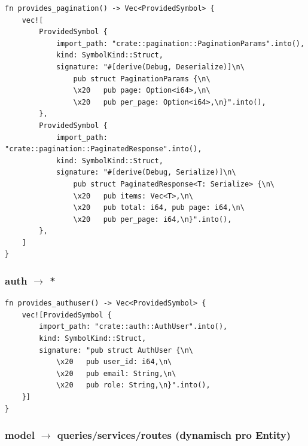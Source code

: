 \documentclass[11pt,a4paper]{article}
\begin{document}
\begin{lstlisting}
fn provides_pagination() -> Vec<ProvidedSymbol> {
    vec![
        ProvidedSymbol {
            import_path: "crate::pagination::PaginationParams".into(),
            kind: SymbolKind::Struct,
            signature: "#[derive(Debug, Deserialize)]\n\
                pub struct PaginationParams {\n\
                \x20   pub page: Option<i64>,\n\
                \x20   pub per_page: Option<i64>,\n}".into(),
        },
        ProvidedSymbol {
            import_path: "crate::pagination::PaginatedResponse".into(),
            kind: SymbolKind::Struct,
            signature: "#[derive(Debug, Serialize)]\n\
                pub struct PaginatedResponse<T: Serialize> {\n\
                \x20   pub items: Vec<T>,\n\
                \x20   pub total: i64, pub page: i64,\n\
                \x20   pub per_page: i64,\n}".into(),
        },
    ]
}
\end{lstlisting}

\subsubsection{auth $\to$ *}

\begin{lstlisting}
fn provides_authuser() -> Vec<ProvidedSymbol> {
    vec![ProvidedSymbol {
        import_path: "crate::auth::AuthUser".into(),
        kind: SymbolKind::Struct,
        signature: "pub struct AuthUser {\n\
            \x20   pub user_id: i64,\n\
            \x20   pub email: String,\n\
            \x20   pub role: String,\n}".into(),
    }]
}
\end{lstlisting}

\subsubsection{model $\to$ queries/services/routes (dynamisch pro Entity)}
\end{document}
